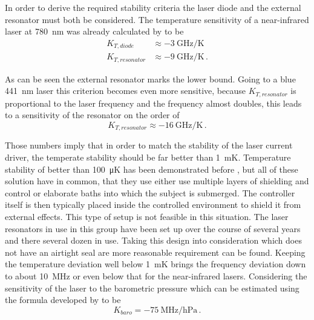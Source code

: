 In order to derive the required stability criteria the laser diode and the external resonator must both be considered. The temperature sensitivity of a near-infrared laser at \qty{780}{\nm} was already calculated by \citeauthor{thesis_tilman} \cite{thesis_tilman} to be
\begin{align*}
    K_{T,diode} &\approx \qty{-3}{\GHz \per \K}\\
    K_{T,resonator} &\approx \qty{-9}{\GHz \per \K}\,.
\end{align*}

As can be seen the external resonator marks the lower bound. Going to a blue \qty{441}{\nm} laser this criterion becomes even more sensitive, because $K_{T,resonator}$ is proportional to the laser frequency and the frequency almost doubles, this leads to a sensitivity of the resonator on the order of
\begin{equation}
    K_{T,resonator} \approx \qty{-16}{\GHz \per \K}\,.
\end{equation}

Those numbers imply that in order to match the stability of the laser current driver, the temperate stability should be far better than \qty{1}{\milli \K}. Temperature stability of better than \qty{100}{\micro \K} has been demonstrated before \cite{tempcontroller_10uK,tempcontroller_10uK_jw,tempcontroller_15uK,tempcontroller_30uK,tempcontroller_40uK,tempcontroller_50uK,tempcontroller_65uK}, but all of these solution have in common, that they use either use multiple layers of shielding and control or elaborate baths into which the subject is submerged. The controller itself is then typically placed inside the controlled environment to shield it from external effects. This type of setup is not feasible in this situation. The laser resonators in use in this group \cite{thesis_tilman} have been set up over the course of several years and there several dozen in use. Taking this design into consideration which does not have an airtight seal are more reasonable requirement can be found. Keeping the temperature deviation well below \qty{1}{\milli \K} brings the frequency deviation down to about \qty{10}{\MHz} or even below that for the near-infrared lasers. Considering the sensitivity of the laser to the barometric pressure which can be estimated using the formula developed by \citeauthor{ciddor} \cite{ciddor} to be
\begin{equation}
    K_{baro} =  \qty{-75}{\MHz \per \hecto \Pa}\,.
\end{equation}

